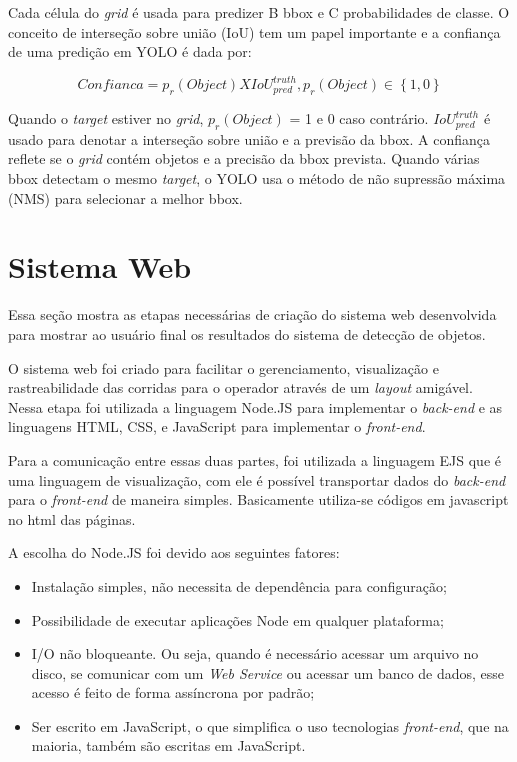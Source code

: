 Cada célula do  \textit{grid} é usada para predizer B bbox e C probabilidades de classe. O conceito de interseção sobre união (IoU) tem um papel importante e a confiança de uma predição em YOLO é dada por:

\begin{equation}
    Confianca = p_r(Object) X IoU_{pred}^{truth} , p_r(Object) \in \left \{ 1\right.,\left.0\right \}
\end{equation}

Quando o \textit{target} estiver no \textit{grid}, \(p_r(Object)\) = 1 e 0 caso contrário. \(IoU_{pred}^{truth}\) é usado para denotar a interseção sobre união e a previsão da bbox. 
A confiança reflete se o \textit{grid} contém objetos e a precisão da bbox prevista. Quando várias bbox detectam o mesmo \textit{target}, o YOLO usa o método de não supressão máxima (NMS) para selecionar a melhor bbox.


\section{Sistema Web} \label{sec:web}

Essa seção mostra as etapas necessárias de criação do sistema web desenvolvida para mostrar ao usuário final os resultados do sistema de detecção de objetos.

O sistema web foi criado para facilitar o gerenciamento, visualização e rastreabilidade das corridas para o operador através de um \textit{layout} amigável. Nessa etapa foi utilizada a linguagem Node.JS para implementar o \textit{back-end} e as linguagens HTML, CSS,  e JavaScript para implementar o \textit{front-end}. 

Para a comunicação entre essas duas partes, foi utilizada a linguagem EJS que é uma linguagem de visualização, com ele é possível transportar dados do \textit{back-end} para o \textit{front-end} de maneira simples. Basicamente utiliza-se códigos em javascript no html das páginas. 

A escolha do Node.JS foi devido aos seguintes fatores:

\begin{itemize}
    \item Instalação simples, não necessita de dependência para configuração;
    \item Possibilidade de executar aplicações Node em qualquer plataforma;
    \item I/O não bloqueante. Ou seja, quando é necessário acessar um arquivo no disco, se comunicar com um \textit{Web Service} ou acessar um banco de dados, esse acesso é feito de forma assíncrona por padrão;
    \item Ser escrito em JavaScript, o que simplifica o uso tecnologias \textit{front-end}, que na maioria, também são escritas em JavaScript.
\end{itemize}
 
